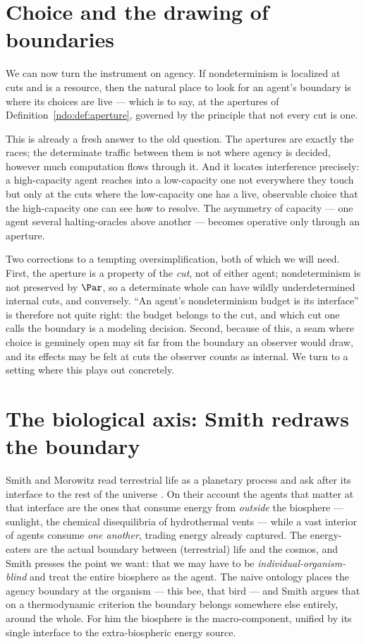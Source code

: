 \bigskip
\section{Choice and the drawing of boundaries}\label{ndo:sec:boundaries}

We can now turn the instrument on agency. If nondeterminism is localized at cuts
and is a resource, then the natural place to look for an agent's boundary is where
its choices are live --- which is to say, at the apertures of
Definition~\ref{ndo:def:aperture}, governed by the principle that not every cut is
one.


\noindent
This is already a fresh answer to the old question. The apertures are exactly the
races; the determinate traffic between them is not where agency is decided, however
much computation flows through it. And it locates interference precisely: a
high-capacity agent reaches into a low-capacity one not everywhere they touch but
only at the cuts where the low-capacity one has a live, observable choice that the
high-capacity one can see how to resolve. The asymmetry of capacity --- one agent
several halting-oracles above another --- becomes operative only through an aperture.

Two corrections to a tempting oversimplification, both of which we will need. First,
the aperture is a property of the \emph{cut}, not of either agent; nondeterminism is
not preserved by $\Par$, so a determinate whole can have wildly underdetermined
internal cuts, and conversely. ``An agent's nondeterminism budget is its interface''
is therefore not quite right: the budget belongs to the cut, and which cut one calls
the boundary is a modeling decision. Second, because of this, a seam where choice is
genuinely open may sit far from the boundary an observer would draw, and its effects
may be felt at cuts the observer counts as internal. We turn to a setting where this
plays out concretely.


\section{The biological axis: Smith redraws the boundary}\label{ndo:sec:smith}

Smith and Morowitz read terrestrial life as a planetary process and ask after its
interface to the rest of the universe \cite{SmithMorowitz}. On their account the agents that
matter at that interface are the ones that consume energy from \emph{outside} the
biosphere --- sunlight, the chemical disequilibria of hydrothermal vents --- while a
vast interior of agents consume \emph{one another}, trading energy already captured.
The energy-eaters are the actual boundary between (terrestrial) life and the cosmos,
and Smith presses the point we want: that we may have to be
\emph{individual-organism-blind} and treat the entire biosphere as the agent. The
naive ontology places the agency boundary at the organism --- this bee, that bird ---
and Smith argues that on a thermodynamic criterion the boundary belongs somewhere else
entirely, around the whole. For him the biosphere is the macro-component, unified by
its single interface to the extra-biospheric energy source.

